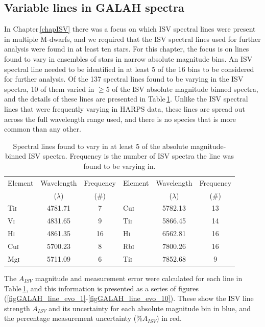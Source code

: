\subsection{Variable lines in GALAH spectra}
\label{secGALAHlines}
In Chapter\,\ref{chapISV} there was a focus on which ISV spectral lines were present in multiple M-dwarfs, and we required that the ISV spectral lines used for further analysis were found in at least ten stars. For this chapter, the focus is on lines found to vary in ensembles of stars in narrow absolute magnitude bins. An ISV spectral line needed to be identified in at least 5 of the 16 bins to be considered for further analysis. Of the 137 spectral lines found to be varying in the ISV spectra, 10 of them varied in $\geq$5 of the ISV absolute magnitude binned spectra, and the details of these lines are presented in Table\,\ref{tabGALAHfreqlines}. Unlike the ISV spectral lines that were frequently varying in HARPS data, these lines are spread out across the full wavelength range used, and there is no species that is more common than any other.\\

\begin{table}[]
    \centering
    \begin{tabular}{|l|c|c||l|c|c|}
    \hline
    Element & Wavelength & Frequency & Element & Wavelength & Frequency \\
     & ($\lambda$) & (\#) &   & ($\lambda$) & (\#) \\
     \hline
Ti\textsc{i} & 4781.71 & 7 & Cu\textsc{i} & 5782.13 & 13 \\ 
V\textsc{i} & 4831.65 & 9 &   Ti\textsc{i} & 5866.45 & 14 \\
H\textsc{i} & 4861.35 & 16 &    H\textsc{i} & 6562.81 & 16 \\   
Cu\textsc{i} & 5700.23 & 8 &  Rb\textsc{i} & 7800.26 & 16 \\ 
Mg\textsc{i} & 5711.09 & 6 &   Ti\textsc{i} & 7852.68 & 9 \\  
\hline
    \end{tabular}
    \caption{Spectral lines found to vary in at least 5 of the absolute magnitude-binned ISV spectra. Frequency is the number of ISV spectra the line was found to be varying in.}
    \label{tabGALAHfreqlines}
\end{table}

The $A_{ISV}$ magnitude and measurement error were calculated for each line in Table\,\ref{tabGALAHfreqlines}, and this information is presented as a series of figures (\ref{figGALAH_line_evo_1}-\ref{figGALAH_line_evo_10}). These show the ISV line strength $A_{ISV}$ and its uncertainty for each absolute magnitude bin in blue, and the percentage measurement uncertainty (\%$A_{ISV}$) in red.\\

